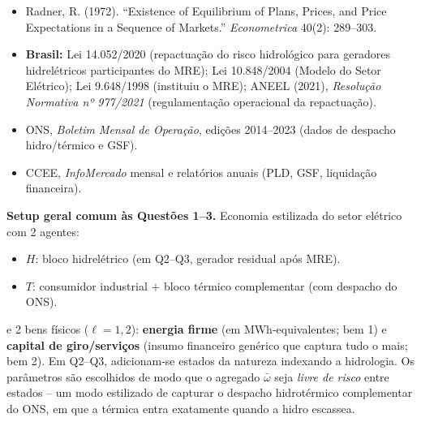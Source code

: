 \documentclass[11pt,addpoints]{exam}
\begin{document}
\begin{contextbox}
\begin{itemize}[noitemsep,topsep=0pt]
\item Radner, R. (1972). ``Existence of Equilibrium of Plans, Prices, and Price Expectations in a Sequence of Markets.'' \textit{Econometrica} 40(2): 289--303.
\item \textbf{Brasil:} Lei 14.052/2020 (repactuação do risco hidrológico para geradores hidrelétricos participantes do MRE); Lei 10.848/2004 (Modelo do Setor Elétrico); Lei 9.648/1998 (instituiu o MRE); ANEEL (2021), \textit{Resolução Normativa nº 977/2021} (regulamentação operacional da repactuação).
\item ONS, \textit{Boletim Mensal de Operação}, edições 2014--2023 (dados de despacho hidro/térmico e GSF).
\item CCEE, \textit{InfoMercado} mensal e relatórios anuais (PLD, GSF, liquidação financeira).
\end{itemize}
\end{contextbox}

\vspace{0.5em}

\noindent\textbf{Setup geral comum às Questões 1--3.} Economia estilizada do setor elétrico com 2 agentes:
\begin{itemize}[noitemsep,topsep=2pt]
\item $H$: bloco hidrelétrico (em Q2--Q3, gerador residual após MRE).
\item $T$: consumidor industrial $+$ bloco térmico complementar (com despacho do ONS).
\end{itemize}
e 2 bens físicos ($\ell = 1, 2$): \textbf{energia firme} (em MWh-equivalentes; bem 1) e \textbf{capital de giro/serviços} (insumo financeiro genérico que captura tudo o mais; bem 2). Em Q2--Q3, adicionam-se estados da natureza indexando a hidrologia. Os parâmetros são escolhidos de modo que o agregado $\bar\omega$ seja \emph{livre de risco} entre estados -- um modo estilizado de capturar o despacho hidrotérmico complementar do ONS, em que a térmica entra exatamente quando a hidro escassea.
\end{document}
